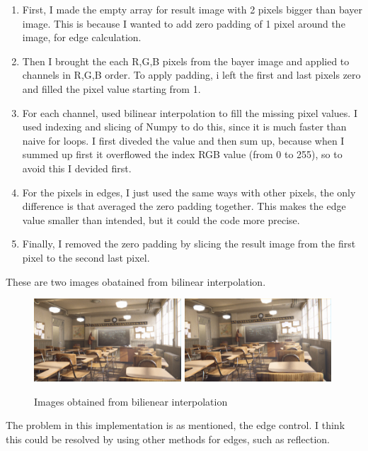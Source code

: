 \begin{enumerate}
    \item First, I made the empty array for result image with 2 pixels bigger than bayer image. This is because I wanted to add zero padding of 1 pixel around the image, for edge calculation.
    \item Then I brought the each R,G,B pixels from the bayer image and applied to channels in R,G,B order. To apply padding, i left the first and last pixels zero and filled the pixel value starting from 1.
    \item For each channel, used bilinear interpolation to fill the missing pixel values. I used indexing and slicing of Numpy to do this, since it is much faster than naive for loops. I first diveded the value and then sum up, because when I summed up first it overflowed the index RGB value (from 0 to 255), so to avoid this I devided first.
    \item For the pixels in edges, I just used the same ways with other pixels, the only difference is that averaged the zero padding together. This makes the edge value smaller than intended, but it could the code more precise.
    \item Finally, I removed the zero padding by slicing the result image from the first pixel to the second last pixel.
\end{enumerate}

These are two images obatained from bilinear interpolation.

\begin{figure}
    \centering
    \includegraphics[width=5.5cm]{../result/bilinear_img1.png}
    \includegraphics[width=5.5cm]{../result/bilinear_img2.png}
\caption{Images obtained from bilienear interpolation}
\end{figure}

The problem in this implementation is as mentioned, the edge control. I think this could be resolved by using other methods for edges, such as reflection.


